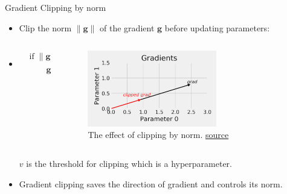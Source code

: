 \documentclass[compress,oilve,t]{beamer}
\begin{document}
\begin{frame}{Gradient Clipping by norm}
	\begin{itemize}
		\item Clip the norm $\|\bm{g}\|$ of the gradient $\bm{g}$ before updating parameters:
		\item[]
		\begin{columns}
			\centering
			\begin{column}{0.4\textwidth}
				\centering
				\[
				\begin{aligned}
					&\text{if} \; \|\bm{g}\| > v:\\
					&\qquad \bm{g} \gets \frac{\bm g}{\|\bm g\|} v
				\end{aligned}
				\]
			\end{column}
			\begin{column}{0.6\textwidth}
				\begin{figure}[H]
					\centering	\includegraphics[width=0.65\textwidth]{Figs/clip-by-norm.png}
					\caption{The effect of clipping by norm. \href{https://github.com/dvgodoy/PyTorchStepByStep/blob/master/ChapterExtra.ipynb}{source}}
				\end{figure}
			\end{column}
		\end{columns}
		
		$v$ is the threshold for clipping which is a hyperparameter.
		\item Gradient clipping saves the direction of gradient and controls its norm.
	\end{itemize}
\end{frame}
\end{document}
